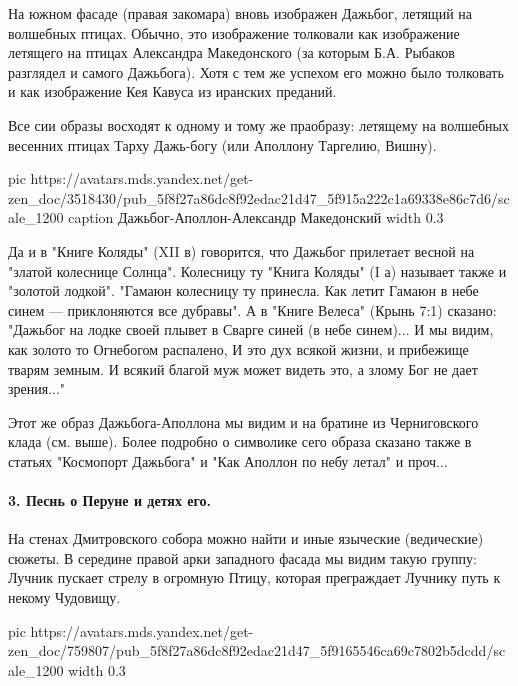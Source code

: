 На южном фасаде (правая закомара) вновь изображен Дажьбог, летящий на волшебных
птицах. Обычно, это изображение толковали как изображение летящего на птицах
Александра Македонского (за которым Б.А. Рыбаков разглядел и самого Дажьбога).
Хотя с тем же успехом его можно было толковать и как изображение Кея Кавуса из
иранских преданий.

Все сии образы восходят к одному и тому же праобразу: летящему на волшебных
весенних птицах Тарху Дажь-богу (или Аполлону Таргелию, Вишну).

\ifcmt
pic https://avatars.mds.yandex.net/get-zen_doc/3518430/pub_5f8f27a86dc8f92edac21d47_5f915a222c1a69338e86c7d6/scale_1200
caption Дажьбог-Аполлон-Александр Македонский
  width 0.3
\fi

Да и в "Книге Коляды" (XII в) говорится, что Дажьбог прилетает весной на
"златой колеснице Солнца". Колесницу ту "Книга Коляды" (I а) называет также и
"золотой лодкой". "Гамаюн колесницу ту принесла. Как летит Гамаюн в небе синем
— приклоняются все дубравы". А в "Книге Велеса" (Крынь 7:1) сказано: "Дажьбог
на лодке своей плывет в Сварге синей (в небе синем)... И мы видим, как золото
то Огнебогом распалено, И это дух всякой жизни, и прибежище тварям земным. И
всякий благой муж может видеть это, а злому Бог не дает зрения..."

Этот же образ Дажьбога-Аполлона мы видим и на братине из Черниговского клада
(см. выше). Более подробно о символике сего образа сказано также в статьях
"Космопорт Дажьбога" и "Как Аполлон по небу летал" и проч...

\paragraph{3. Песнь о Перуне и детях его.}

На стенах Дмитровского собора можно найти и иные языческие (ведические) сюжеты.
В середине правой арки западного фасада мы видим такую группу: Лучник пускает
стрелу в огромную Птицу, которая преграждает Лучнику путь к некому Чудовищу.

\ifcmt
pic https://avatars.mds.yandex.net/get-zen_doc/759807/pub_5f8f27a86dc8f92edac21d47_5f9165546ca69c7802b5dcdd/scale_1200
  width 0.3
\fi

